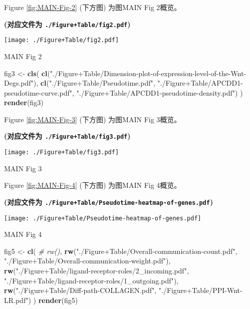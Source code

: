 \documentclass[
]{article}
\newenvironment{Shaded}{\begin{snugshade}}{\end{snugshade}}
\newcommand{\CommentTok}[1]{\textcolor[rgb]{0.56,0.35,0.01}{\textit{#1}}}
\newcommand{\KeywordTok}[1]{\textcolor[rgb]{0.13,0.29,0.53}{\textbf{#1}}}
\newcommand{\NormalTok}[1]{#1}
\newcommand{\StringTok}[1]{\textcolor[rgb]{0.31,0.60,0.02}{#1}}
\begin{document}
Figure \ref{fig:MAIN-Fig-2} (下方图) 为图MAIN Fig 2概览。

\textbf{(对应文件为 \texttt{./Figure+Table/fig2.pdf})}

\def\@captype{figure}
\begin{center}
\texttt{[image: ./Figure+Table/fig2.pdf]}
\caption{MAIN Fig 2}\label{fig:MAIN-Fig-2}
\end{center}

\begin{Shaded}
\begin{Highlighting}[]
\NormalTok{fig3 \textless{}{-}}\StringTok{ }\KeywordTok{cls}\NormalTok{(}
  \KeywordTok{cl}\NormalTok{(}\StringTok{"./Figure+Table/Dimension{-}plot{-}of{-}expression{-}level{-}of{-}the{-}Wnt{-}Degs.pdf"}\NormalTok{),}
  \KeywordTok{cl}\NormalTok{(}\StringTok{"./Figure+Table/Pseudotime.pdf"}\NormalTok{,}
    \StringTok{"./Figure+Table/APCDD1{-}pseudotime{-}curve.pdf"}\NormalTok{,}
    \StringTok{"./Figure+Table/APCDD1{-}pseudotime{-}density.pdf"}\NormalTok{)}
\NormalTok{)}
\KeywordTok{render}\NormalTok{(fig3)}
\end{Highlighting}
\end{Shaded}

Figure \ref{fig:MAIN-Fig-3} (下方图) 为图MAIN Fig 3概览。

\textbf{(对应文件为 \texttt{./Figure+Table/fig3.pdf})}

\def\@captype{figure}
\begin{center}
\texttt{[image: ./Figure+Table/fig3.pdf]}
\caption{MAIN Fig 3}\label{fig:MAIN-Fig-3}
\end{center}

Figure \ref{fig:MAIN-Fig-4} (下方图) 为图MAIN Fig 4概览。

\textbf{(对应文件为 \texttt{./Figure+Table/Pseudotime-heatmap-of-genes.pdf})}

\def\@captype{figure}
\begin{center}
\texttt{[image: ./Figure+Table/Pseudotime-heatmap-of-genes.pdf]}
\caption{MAIN Fig 4}\label{fig:MAIN-Fig-4}
\end{center}

\begin{Shaded}
\begin{Highlighting}[]
\NormalTok{fig5 \textless{}{-}}\StringTok{ }\KeywordTok{cl}\NormalTok{(}
  \CommentTok{\# rw(),}
  \KeywordTok{rw}\NormalTok{(}\StringTok{"./Figure+Table/Overall{-}communication{-}count.pdf"}\NormalTok{,}
    \StringTok{"./Figure+Table/Overall{-}communication{-}weight.pdf"}\NormalTok{),}
  \KeywordTok{rw}\NormalTok{(}\StringTok{"./Figure+Table/ligand{-}receptor{-}roles/2\_incoming.pdf"}\NormalTok{,}
    \StringTok{"./Figure+Table/ligand{-}receptor{-}roles/1\_outgoing.pdf"}\NormalTok{),}
  \KeywordTok{rw}\NormalTok{(}\StringTok{"./Figure+Table/Diff{-}path{-}COLLAGEN.pdf"}\NormalTok{,}
    \StringTok{"./Figure+Table/PPI{-}Wnt{-}LR.pdf"}\NormalTok{)}
\NormalTok{)}
\KeywordTok{render}\NormalTok{(fig5)}
\end{Highlighting}
\end{Shaded}
\end{document}
